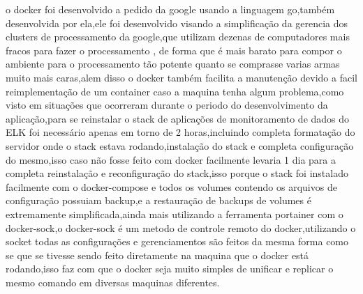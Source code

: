 \documentclass[
	12pt,				%
	openright,			%
	oneside,			%
	a4paper,			%
	english,			%
	french,				%
	spanish,			%
	brazil,				%
	]{abntex2}
\begin{document}
o docker foi desenvolvido a pedido da google usando a linguagem go,também desenvolvida por ela,ele foi desenvolvido visando a simplificação da gerencia dos clusters de processamento da google,que utilizam dezenas de computadores mais fracos para fazer o processamento , de forma que é mais barato para compor o ambiente para o processamento tão potente quanto se comprasse varias armas muito mais caras,alem disso o docker também facilita a manutenção devido a facil reimplementação de um container caso a maquina tenha algum problema,como visto em situações que ocorreram durante o periodo do desenvolvimento da aplicação,para se reinstalar o stack de aplicações de monitoramento de dados do ELK  foi necessário apenas em torno de 2 horas,incluindo completa formatação do servidor onde o stack estava rodando,instalação do stack e completa configuração do mesmo,isso caso não fosse feito com docker facilmente levaria 1 dia para a completa reinstalação e reconfiguração do stack,isso porque o stack foi instalado facilmente com o docker-compose e todos os volumes contendo os arquivos de configuração possuiam backup,e a restauração de backups de volumes é extremamente simplificada,ainda mais utilizando a ferramenta portainer  com o docker-sock,o docker-sock é um metodo de controle remoto do docker,utilizando o socket todas as configurações e gerenciamentos são feitos da mesma forma como se que se tivesse sendo feito diretamente na maquina que o docker está rodando,isso faz com que o docker seja muito simples de unificar e replicar o mesmo comando em diversas maquinas diferentes.


\end{document}
